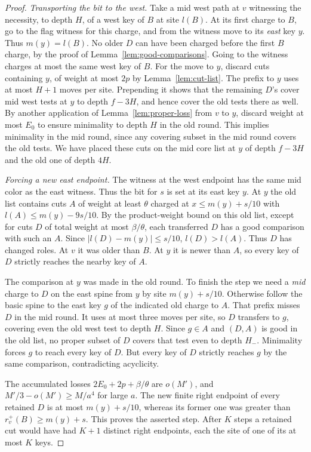 \begin{proof}
\emph{Transporting the bit to the west.}
Take a mid west path at \(v\) witnessing the necessity, to depth
\(H\), of a west key of \(B\) at site \(l(B)\). At its first charge
to \(B\), go to the flag witness for this charge, and from the witness
move to its \emph{east} key \(y\). Thus \(m(y)=l(B)\). No older \(D\)
can have been charged before the first \(B\) charge, by the proof of
Lemma~\ref{lem:good-comparisons}. Going to the witness charges at most
the same west key of \(B\). For the move to \(y\), discard cuts
containing \(y\), of weight at most \(2p\) by
Lemma~\ref{lem:cut-list}. The prefix to \(y\) uses at most \(H+1\)
moves per site. Prepending it shows that the remaining \(D\)'s cover
mid west tests at \(y\) to depth \(f-3H\), and hence cover the old
tests there as well. By another application of
Lemma~\ref{lem:proper-loss} from \(v\) to \(y\), discard weight at most
\(E_0\) to ensure minimality to depth \(H\) in the old round. This
implies minimality in the mid round, since any covering subset in the
mid round covers the old tests. We have placed these cuts on the mid
core list at \(y\) of depth \(f-3H\) and the old one of depth \(4H\).

\emph{Forcing a new east endpoint.}
The witness at the west endpoint has the same mid color as the east
witness. Thus
the bit for \(s\) is set at its east key \(y\). At \(y\) the old list
contains cuts \(A\) of weight at least \(\theta\) charged at
\(x\le m(y)+s/10\) with \(l(A)\le m(y)-9s/10\).
By the product-weight bound on this old list, except for cuts \(D\)
of total weight at most \(\beta/\theta\), each transferred \(D\) has
a good comparison with such an \(A\). Since
\(\lvert l(D)-m(y)\rvert\le s/10\), \(l(D)>l(A)\).
Thus \(D\) has changed roles. At \(v\) it was older than \(B\).
At \(y\) it is newer than \(A\), so every key of \(D\) strictly
reaches the nearby key of \(A\).

The comparison at \(y\) was made in the old round. To finish the step
we need a \emph{mid} charge to \(D\) on the east spine from
\(y\) by site \(m(y)+s/10\). Otherwise follow the basic spine to
the east key \(g\) of the indicated old charge to \(A\).
That prefix misses \(D\) in the mid round. It uses at most three
moves per site, so \(D\) transfers to \(g\), covering even the old
west test to depth \(H\). Since \(g\in A\) and \((D,A)\) is good in
the old list, no proper subset of \(D\) covers that test even to
depth \(H_-\). Minimality forces \(g\) to reach every key of \(D\).
But every key of \(D\) strictly reaches \(g\) by the same comparison,
contradicting acyclicity.

The accumulated losses \(2E_0+2p+\beta/\theta\) are \(o(M')\),
and \(M'/3-o(M')\ge M/a^4\) for large \(a\). The new finite right
endpoint of every retained \(D\) is at most \(m(y)+s/10\), whereas
its former one was greater than \(r_v^+(B)\ge m(y)+s\). This proves
the asserted step. After \(K\) steps a retained cut would have had
\(K+1\) distinct right endpoints, each the site of one of its at most
\(K\) keys.
\end{proof}

